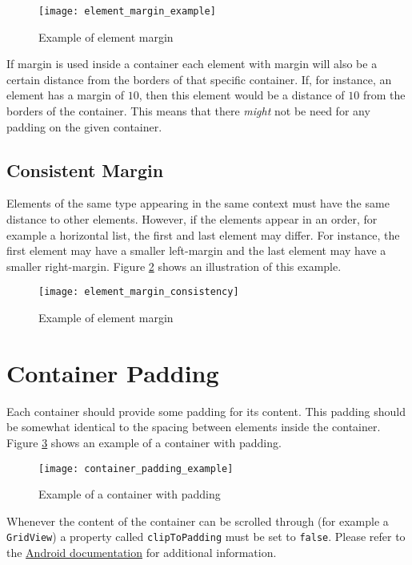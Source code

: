 \begin{figure}[h]
	\centering
	\texttt{[image: element\_margin\_example]}
	\caption{Example of element margin}
	\label{fig:element_margin_example}
\end{figure}

\begin{note}
	If margin is used inside a container each element with margin will also be a certain distance from the borders of that specific container. If, for instance, an element has a margin of $10$, then this element would be a distance of $10$ from the borders of the container. This means that there \textit{might} not be need for any padding on the given container.
\end{note}

\subsection{Consistent Margin}
Elements of the same type appearing in the same context must have the same distance to other elements. However, if the elements appear in an order, for example a horizontal list, the first and last element may differ. For instance, the first element may have a smaller left-margin and the last element may have a smaller right-margin. Figure \ref{fig:element_margin_consistency} shows an illustration of this example.

\begin{figure}[h]
	\centering
	\texttt{[image: element\_margin\_consistency]}
	\caption{Example of element margin}
	\label{fig:element_margin_consistency}
\end{figure}


\section{Container Padding}
Each container should provide some padding for its content. This padding should be somewhat identical to the spacing between elements inside the container. Figure \ref{fig:container_padding_example} shows an example of a container with padding. 

\begin{figure}[h]
	\centering
	\texttt{[image: container\_padding\_example]}
	\caption{Example of a container with padding}
	\label{fig:container_padding_example}
\end{figure}

\begin{note}
	Whenever the content of the container can be scrolled through (for example a \texttt{GridView}) a property called \texttt{clipToPadding} must be set to \texttt{false}. Please refer to the \href{http://developer.android.com/reference/android/view/ViewGroup.html#attr_android:clipToPadding}{Android documentation} for additional information.
\end{note}
